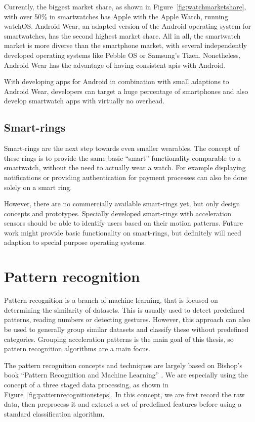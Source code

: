 Currently, the biggest market share, as shown in Figure~\ref{fig:watchmarketshare}, with over 50\% in smartwatches has Apple with the Apple Watch, running watchOS. Android Wear, an adapted version of the Android operating system for smartwatches, has the second highest market share. All in all, the smartwatch market is more diverse than the smartphone market, with several independently developed operating systems like Pebble OS or Samsung's Tizen. Nonetheless, Android Wear has the advantage of having consistent \Glspl{api} with Android. 

With developing \glspl{app} for Android in combination with small adaptions to Android Wear, developers can target a huge percentage of smartphones and also develop smartwatch apps with virtually no overhead.

\subsection{Smart-rings}
Smart-rings are the next step towards even smaller wearables. The concept of these rings is to provide the same basic ``smart'' functionality comparable to a smartwatch, without the need to actually wear a watch. For example displaying notifications or providing authentication for payment processes can also be done solely on a smart ring.

However, there are no commercially available smart-rings yet, but only design concepts and prototypes. Specially developed smart-rings with acceleration sensors should be able to identify users based on their motion patterns. Future work might provide basic functionality on smart-rings, but definitely will need adaption to special purpose operating systems. 

\section{Pattern recognition}
Pattern recognition is a branch of machine learning, that is focused on determining the similarity of datasets. This is usually used to detect predefined patterns, \eg reading numbers or detecting gestures. However, this approach can also be used to generally group similar datasets and classify these without predefined categories. Grouping acceleration patterns is the main goal of this thesis, so pattern recognition algorithms are a main focus.

The pattern recognition concepts and techniques are largely based on Bishop's book ``Pattern Recognition and Machine Learning'' \cite{bishop2006pattern}. We are especially using the concept of a three staged data processing, as shown in Figure~\ref{fig:patternrecognitionsteps}. In this concept, we are first record the raw data, then preprocess it and extract a set of predefined features before using a standard classification algorithm.

